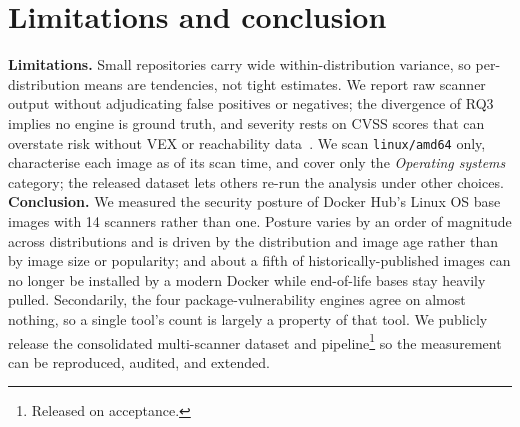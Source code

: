 \documentclass[12pt]{article}
\begin{document}
\section{Limitations and conclusion}
\label{sec:conclusion}
\textbf{Limitations.} Small repositories carry wide within-distribution
variance, so per-distribution means are tendencies, not tight estimates.
We report raw scanner output without adjudicating false positives or negatives;
the divergence of RQ3 implies no engine is ground truth, and severity rests on
CVSS scores that can overstate risk without VEX or reachability
data~\cite{zhou2026realitycheck}. We scan \texttt{linux/amd64} only, characterise
each image as of its scan time, and cover only the \emph{Operating systems}
category; the released dataset lets others re-run the analysis under other
choices.
\textbf{Conclusion.} We measured the security posture of Docker Hub's Linux OS
base images with 14 scanners rather than one. Posture varies by an order of
magnitude across distributions and is driven by the distribution and image age rather than by image size or
popularity; and about a fifth of historically-published images can no longer
be installed by a modern Docker while end-of-life bases stay heavily pulled.
Secondarily, the four package-vulnerability engines agree on almost nothing, so
a single tool's count is largely a property of that tool. We publicly release
the consolidated multi-scanner dataset and pipeline\footnote{Released on
acceptance.} so the measurement can be reproduced, audited, and extended.



\end{document}
